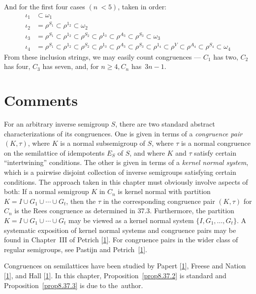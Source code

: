 \documentclass{surv-l}
\numberwithin{equation}{section}
\numberwithin{table}{section}
\numberwithin{figure}{section}
\theoremstyle{definition}
\begin{document}
And for the first four cases $(n\ <5)$, taken in order:
\begin{align*}
\iota_{1}&\subset\omega_{1} \\
\iota_{2} &=\rho^{S_{1}}\subset\rho^{1_{2}}\subset\omega_{2} \\
\iota_{3}&=\rho^{S_{1}}\subset\rho^{1_{2}}\subset\rho^{S_{2}}\subset\rho^{1_{3}}\subset\rho^{A_{3}}\subset\rho^{S_{3}}\subset\omega_{3} \\
\iota_{4} &=\rho^{S_{1}}\subset\rho^{1_{2}}\subset\rho^{S_{2}}\subset\rho^{1_{3}}\subset\rho^{A_{3}}\subset\rho^{S_{3}}\subset\rho^{1_{4}}\subset\rho^{V}\subset\rho^{A_{4}}\subset\rho^{S_{4}}\subset\omega_{4}
\end{align*}
From these inclusion strings, we may easily count congruences
--- $C_{1}$ has two, $C_{2}$ has four, $C_{3}$ has seven, and, for
$n \geq 4, C_{n}$ has~$3n -1$.

\section{Comments}\label{sec8.41}

For an arbitrary inverse semigroup $S$, there are two standard
abstract characterizations of its congruences. One is given in
terms of a \emph{congruence pair}
$(K,\tau)$, where $K$ is a normal subsemigroup of $S$, where
$\tau$ is a normal congruence on the semilattice of idempotents
$E_{S}$ of $S$, and where $K$ and $\tau$ satisfy certain
``intertwining'' conditions. The other is given in terms of a
\emph{kernel normal system}, which is
a pairwise disjoint collection of inverse semigroups satisfying
certain conditions. The approach taken in this chapter must
obviously involve aspects of both: If a normal semigroup $K$ in
$C_{n}$ is kernel normal with partition $K=I\cup
G_{1}\cup\cdots\cup G_{t}$, then the $\tau$ in the corresponding
congruence pair $(K, \tau)$ for $C_{n}$ is the Rees congruence as
determined in 37.3. Furthermore, the partition $K=I \cup
G_{1}\cup\cdots\cup G_{t}$ may be viewed as a kernel normal system
$\{I, G_{1},\ldots, G_{t}\}$. A systematic exposition of kernel
normal systems and congruence pairs may be found in Chapter~III of
Petrich [\hyperlink{bib60}{1}]. For congruence pairs in
the wider class of regular semigroups, see Pastijn and Petrich~[\hyperlink{bib58}{1}].

Congruences on semilattices have been studied by
Papert [\hyperlink{bib58}{1}],
Freese and Nation
[\hyperlink{bib16}{1}], and Hall
[\hyperlink{bib26}{1}]. In this chapter,
Proposition~\ref{prop8.37.2} is standard and
Proposition~\ref{prop8.37.3} is due to the~author.
\end{document}
